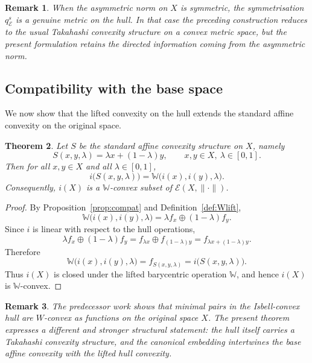 \documentclass[preprint,12pt]{elsarticle}
\numberwithin{equation}{section}
\newtheorem{theorem}{Theorem}[section]
\newtheorem{remark}[theorem]{Remark}
\newcommand{\E}{\mathcal{E}}
\begin{document}
\begin{remark}\label{rem:HullMetricCase}
When the asymmetric norm on \(X\) is symmetric, the symmetrisation
\(q_{\E}^{s}\) is a genuine metric on the hull.  In that case the preceding
construction reduces to the usual Takahashi convexity structure on a convex
metric space, but the present formulation retains the directed information
coming from the asymmetric norm.
\end{remark}

\subsection{Compatibility with the base space}

We now show that the lifted convexity on the hull extends the standard affine
convexity on the original space.

\begin{theorem}\label{thm:Intertwine}
Let \(S\) be the standard affine convexity structure on \(X\), namely
\[
S(x,y,\lambda)=\lambda x+(1-\lambda)y,
\qquad x,y\in X,\ \lambda\in[0,1].
\]
Then for all \(x,y\in X\) and all \(\lambda\in[0,1]\),
\[
i\bigl(S(x,y,\lambda)\bigr)
=
\mathbb W\bigl(i(x),i(y),\lambda\bigr).
\]
Consequently, \(i(X)\) is a \(\mathbb W\)-convex subset of
\(\E(X,\|\cdot\|)\).
\end{theorem}

\begin{proof}
By Proposition~\ref{prop:compat} and Definition~\ref{def:Wlift},
\[
\mathbb W\bigl(i(x),i(y),\lambda\bigr)
=
\lambda f_x\oplus(1-\lambda)f_y.
\]
Since \(i\) is linear with respect to the hull operations,
\[
\lambda f_x\oplus(1-\lambda)f_y
=
f_{\lambda x}\oplus f_{(1-\lambda)y}
=
f_{\lambda x+(1-\lambda)y}.
\]
Therefore
\[
\mathbb W\bigl(i(x),i(y),\lambda\bigr)
=
f_{S(x,y,\lambda)}
=
i\bigl(S(x,y,\lambda)\bigr).
\]
Thus \(i(X)\) is closed under the lifted barycentric operation \(\mathbb W\),
and hence \(i(X)\) is \(\mathbb W\)-convex.
\end{proof}

\begin{remark}\label{rem:structural-upgrade}
The predecessor work shows that minimal pairs in the Isbell-convex hull are
\(W\)-convex as functions on the original space \(X\).  The present theorem
expresses a different and stronger structural statement: the hull itself
carries a Takahashi convexity structure, and the canonical embedding
intertwines the base affine convexity with the lifted hull convexity.
\end{remark}
\end{document}
